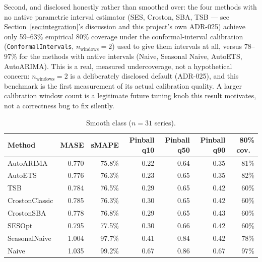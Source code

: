 \documentclass[11pt]{article}
\begin{document}
Second, and disclosed honestly rather than smoothed over: the four methods with no
native parametric interval estimator (SES, Croston, SBA, TSB --- see
Section~\ref{sec:integration}'s discussion and this project's own ADR-025) achieve
only 59--63\% empirical 80\% coverage under the conformal-interval calibration
(\texttt{ConformalIntervals}, $n_{\text{windows}}=2$) used to give them intervals at
all, versus 78--97\% for the methods with native intervals (Naive, Seasonal Naive,
AutoETS, AutoARIMA). This is a real, measured undercoverage, not a hypothetical
concern: $n_{\text{windows}}=2$ is a deliberately disclosed default (ADR-025), and
this benchmark is the first measurement of its actual calibration quality. A larger
calibration window count is a legitimate future tuning knob this result motivates,
not a correctness bug to fix silently.

\begin{table}[htbp]
\centering\footnotesize
\begin{tabular}{lrrrrrr}
\toprule
Method & MASE & sMAPE & Pinball q10 & Pinball q50 & Pinball q90 & 80\% cov.\ \\
\midrule
AutoARIMA & 0.770 & 75.8\% & 0.22 & 0.64 & 0.35 & 81\% \\
AutoETS & 0.776 & 76.3\% & 0.23 & 0.65 & 0.35 & 82\% \\
TSB & 0.784 & 76.5\% & 0.29 & 0.65 & 0.42 & 60\% \\
CrostonClassic & 0.785 & 76.3\% & 0.30 & 0.65 & 0.42 & 60\% \\
CrostonSBA & 0.778 & 76.8\% & 0.29 & 0.65 & 0.43 & 60\% \\
SESOpt & 0.795 & 77.5\% & 0.30 & 0.66 & 0.42 & 60\% \\
SeasonalNaive & 1.004 & 97.7\% & 0.41 & 0.84 & 0.42 & 78\% \\
Naive & 1.035 & 99.2\% & 0.67 & 0.86 & 0.67 & 97\% \\
\bottomrule
\end{tabular}
\caption{Smooth class ($n = 31$ series).}
\label{tab:smooth}
\end{table}
\end{document}
